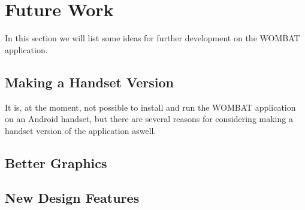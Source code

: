 \section{Future Work}
In this section we will list some ideas for further development on the WOMBAT application.

\subsection{Making a Handset Version}
It is, at the moment, not possible to install and run the WOMBAT application on an Android handset, but there are several reasons for considering making a handset version of the application aswell.

\subsection{Better Graphics}


\subsection{New Design Features}
